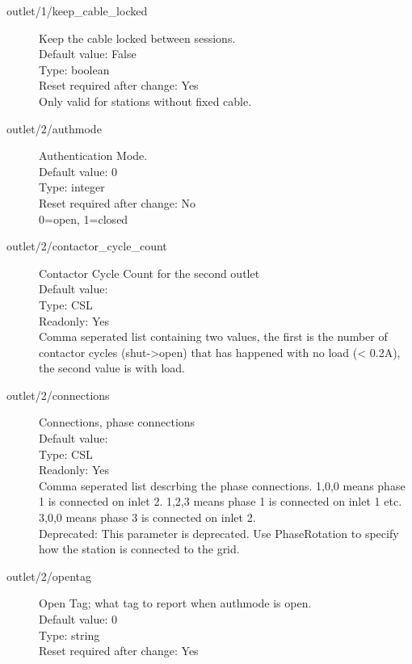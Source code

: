 \begin{description}
\item[outlet/1/keep\_cable\_locked] Keep the cable locked between sessions.\\
  Default value: False\\
  Type: boolean\\
  Reset required after change: Yes\\
  Only valid for stations without fixed cable.\\

\item[outlet/2/authmode] Authentication Mode.\\
  Default value: 0\\
  Type: integer\\
  Reset required after change: No\\
  0=open, 1=closed\\

\item[outlet/2/contactor\_cycle\_count] Contactor Cycle Count for the second outlet\\
  Default value: \\
  Type: CSL\\
  Readonly: Yes\\
  Comma seperated list containing two values, the first is the number of contactor cycles (shut->open) that has happened with no load (< 0.2A), the second value is with load.\\

\item[outlet/2/connections] Connections, phase connections\\
  Default value: \\
  Type: CSL\\
  Readonly: Yes\\
  Comma seperated list descrbing the phase connections. 1,0,0 means phase 1 is connected on inlet 2. 1,2,3 means phase 1 is connected on inlet 1 etc. 3,0,0 means phase 3 is connected on inlet 2.\\
  Deprecated: This parameter is deprecated. Use PhaseRotation to specify how the station is connected to the grid.\\

\item[outlet/2/opentag] Open Tag; what tag to report when authmode is open.\\
  Default value: 0\\
  Type: string\\
  Reset required after change: Yes\\


\end{description}
